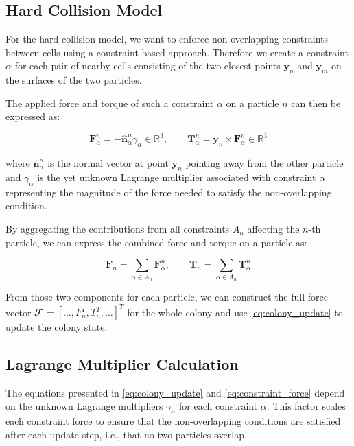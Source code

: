 \documentclass[conference]{IEEEtran}
\begin{document}
\newpage
\subsection{Hard Collision Model}


For the hard collision model, we want to enforce non-overlapping constraints between cells using a constraint-based approach. Therefore we create a constraint $\alpha$ for each pair of nearby cells consisting of the two closest points $\mathbf{y}_n$ and $\mathbf{y}_m$ on the surfaces of the two particles.

The applied force and torque of such a constraint $\alpha$ on a particle $n$ can then be expressed as:

$$
    \mathbf{F}_\alpha^n = - \hat{\mathbf{n}}_\alpha ^n \gamma_\alpha \in \mathbb{R}^3, \qquad \mathbf{T}_\alpha^n = \mathbf{y}_n \times \mathbf{F}_\alpha^n \in \mathbb{R}^3
$$
\label{eq:constraint_force}

where $\hat{\mathbf{n}}_\alpha ^n$ is the normal vector at point $\mathbf{y}_n$ pointing away from the other particle and $\gamma_\alpha$ is the yet unknown Lagrange multiplier associated with constraint $\alpha$ representing the magnitude of the force needed to satisfy the non-overlapping condition.

By aggregating the contributions from all constraints $A_n$ affecting the $n$-th particle, we can express the combined force and torque on a particle as:

$$
    \mathbf{F}_n = \sum_{\alpha \in A_n} \mathbf{F}_\alpha^n, \qquad \mathbf{T}_n = \sum_{\alpha \in A_n} \mathbf{T}_\alpha^n
$$
\label{eq:total_force}

From those two components for each particle, we can construct the full force vector $\mathbfcal{F} = [ \dots, F_n^T, T_n^T, \dots]^T$ for the whole colony and use \autoref{eq:colony_update} to update the colony state.


\subsection{Lagrange Multiplier Calculation}

The equations presented in \autoref{eq:colony_update} and \autoref{eq:constraint_force} depend on the unknown Lagrange multipliers $\gamma_\alpha$ for each constraint $\alpha$. This factor scales each constraint force to ensure that the non-overlapping conditions are satisfied after each update step, i.e., that no two particles overlap.
\end{document}
